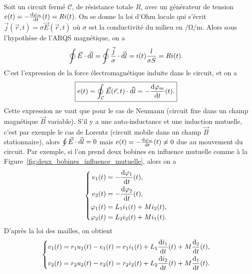 Soit un circuit fermé $\mathcal{C}$, de résistance totale $R$, avec un générateur de tension $e(t)=-\frac{\mathrm{d}\varphi_m}{\mathrm{d} t}(t)=Ri(t)$. On se donne la loi d'Ohm locale qui s'écrit $\vec{j}(\vec{r},t)=\sigma\vec{E}(\vec{r},t)$ où $\sigma$ est la conductivité du milieu en $\si{\per\ohm\per\metre}$. Alors sous l'hypothèse de l'ARQS magnétique, on a 
\begin{equation}
    \oint\vec{E}\cdot\vec{\mathrm{d} l}=\oint\frac{\vec{j}}{\sigma}\cdot\vec{\mathrm{d} l}=i(t)\frac{l}{\sigma S}=Ri(t).
\end{equation}
C'est l'expression de la force électromagnétique induite dans le circuit, et on a
\begin{equation}
    \boxed{
        e(t)=\oint_{\mathcal{C}}\vec{E}(\vec{r},t)\cdot\vec{\mathrm{d} l}=-\frac{\mathrm{d}\varphi_m}{\mathrm{d} t}(t).
    }
\end{equation}
Cette expression ne vaut que pour le cas de Neumann (circuit fixe dans un champ magnétique $\vec{B}$ variable). S'il y a une auto-inductance et une induction mutuelle, c'est par exemple le cas de Lorentz (circuit mobile dans un champ $\vec{B}$ stationnaire), alors $\oint\vec{E}\cdot\vec{\mathrm{d} l}=0$ mais $e(t)=-\frac{\mathrm{d}\varphi_m}{\mathrm{d} t}(t)\neq0$ due au mouvement du circuit.
Par exemple, si l'on prend deux bobines en influence mutuelle comme à la Figure~\ref{fig:deux_bobines_influence_mutuelle}, alors on a 
\begin{equation}
    \left\lbrace
        \begin{aligned}
            e_1(t)&=-\frac{\mathrm{d}\varphi_1}{\mathrm{d} t}(t),\\
            e_2(t)&=-\frac{\mathrm{d}\varphi_2}{\mathrm{d} t}(t),\\
            \varphi_1(t)&=L_1 i_1(t)+Mi_2(t),\\
            \varphi_2(t)&=L_2 i_2(t)+Mi_1(t).
        \end{aligned}
    \right.
\end{equation}
D'après la loi des mailles, on obtient
\begin{equation}
    \left\lbrace
        \begin{aligned}
            v_1(t)&=r_1 u_1(t)-e_1(t)=r_1 i_1(t)+L_1\frac{\mathrm{d} i_1}{\mathrm{d} t}(t)+M\frac{\mathrm{d} _2}{\mathrm{d} t}(t),\\
            v_2(t)&=r_2 u_2(t)-e_2(t)=r_2 i_2(t)+L_2\frac{\mathrm{d} i_2}{\mathrm{d} t}(t)+M\frac{\mathrm{d} _1}{\mathrm{d} t}(t).
        \end{aligned}
    \right.
\end{equation}
